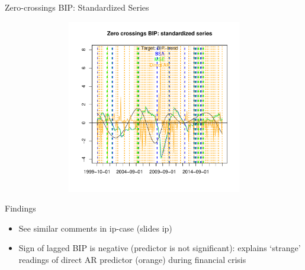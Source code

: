 \documentclass{beamer}
\begin{document}


\begin{frame} {Zero-crossings BIP: Standardized Series}
\begin{figure}[H]\begin{center}\includegraphics[height=3in, width=4.5in]{zero_cross_ifo_l_1.pdf}\caption{\label{data}}\end{center}\end{figure}\end{frame}



\begin{frame} {Findings}
\begin{itemize}
\item See similar comments in ip-case (slides ip)
\item Sign of lagged BIP is negative (predictor is not significant): explains `strange' readings of direct AR predictor (orange) during financial crisis
\end{itemize}
\end{frame}
\end{document}
